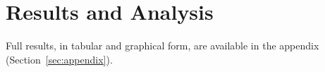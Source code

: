 \section{Results and Analysis}
\label{sec:results-and-analysis}

Full results, in tabular and graphical form, are available in the appendix (Section~\ref{sec:appendix}).
